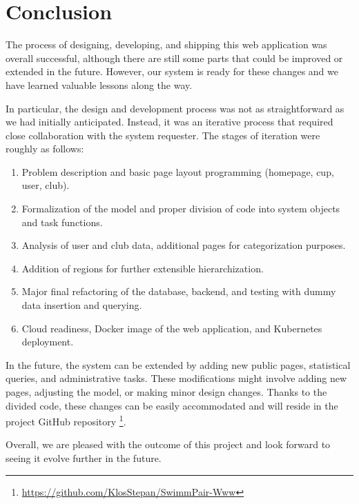 \chapter*{Conclusion}
The process of designing, developing, and shipping this web application was overall successful, although there are still some parts that could be improved or extended in the future. However, our system is ready for these changes and we have learned valuable lessons along the way.

In particular, the design and development process was not as straightforward as we had initially anticipated. Instead, it was an iterative process that required close collaboration with the system requester. The stages of iteration were roughly as follows:

\begin{enumerate}
\item Problem description and basic page layout programming (homepage, cup, user, club).
\item Formalization of the model and proper division of code into system objects and task functions.
\item Analysis of user and club data, additional pages for categorization purposes.
\item Addition of regions for further extensible hierarchization.
\item Major final refactoring of the database, backend, and testing with dummy data insertion and querying.
\item Cloud readiness, Docker image of the web application, and Kubernetes deployment.
\end{enumerate}

In the future, the system can be extended by adding new public pages, statistical queries, and administrative tasks. These modifications might involve adding new pages, adjusting the model, or making minor design changes. Thanks to the divided code, these changes can be easily accommodated and will reside in the project GitHub repository \footnote{\url{https://github.com/KlosStepan/SwimmPair-Www}}.

Overall, we are pleased with the outcome of this project and look forward to seeing it evolve further in the future.

